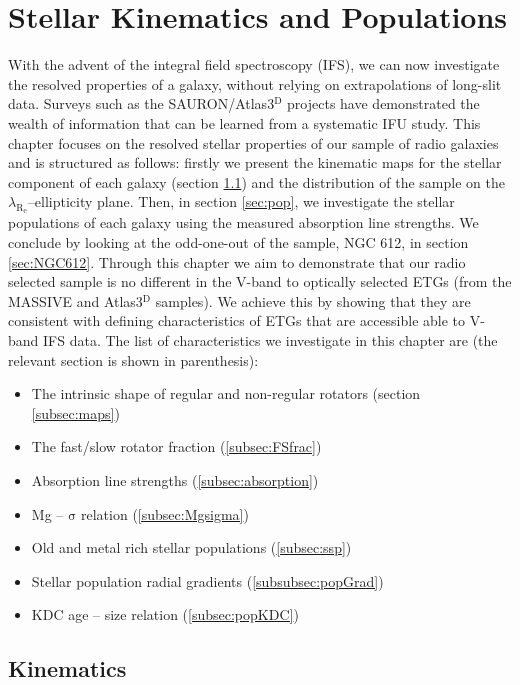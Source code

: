 \chapter{Stellar Kinematics and Populations}
	\label{cha:stellar}
With the advent of the integral field spectroscopy (IFS), we can now investigate the resolved properties of a galaxy, without relying on extrapolations of long-slit data. Surveys such as the SAURON/Atlas3$^\text{D}$ projects have demonstrated the wealth of information that can be learned from a systematic IFU study. This chapter focuses on the resolved stellar properties of our sample of radio galaxies and is structured as follows: firstly we present the kinematic maps for the stellar component of each galaxy (section \ref{sec:stellarKin}) and the distribution of the sample on the $\lambda_\mathrm{R_e}$--ellipticity plane. Then, in section \ref{sec:pop}, we investigate the stellar populations of each galaxy using the measured absorption line strengths. We conclude by looking at the odd-one-out of the sample, NGC 612, in section \ref{sec:NGC612}. Through this chapter we aim to demonstrate that our radio selected sample is no different in the V-band to optically selected ETGs (from the MASSIVE and Atlas3$^\text{D}$ samples). We achieve this by showing that they are consistent with defining characteristics of ETGs that are accessible able to V-band IFS data. The list of characteristics we investigate in this chapter are (the relevant section is shown in parenthesis):
\begin{itemize}
	\item The intrinsic shape of regular and non-regular rotators (section \ref{subsec:maps})
	\item The fast/slow rotator fraction (\ref{subsec:FSfrac})
	\item Absorption line strengths (\ref{subsec:absorption})
	\item Mg -- $\mathrm{\sigma}$ relation (\ref{subsec:Mgsigma})
	\item Old and metal rich stellar populations (\ref{subsec:ssp})
	\item Stellar population radial gradients (\ref{subsubsec:popGrad})
	\item KDC age -- size relation (\ref{subsec:popKDC})
\end{itemize}

\section{Kinematics}
	\label{sec:stellarKin}

